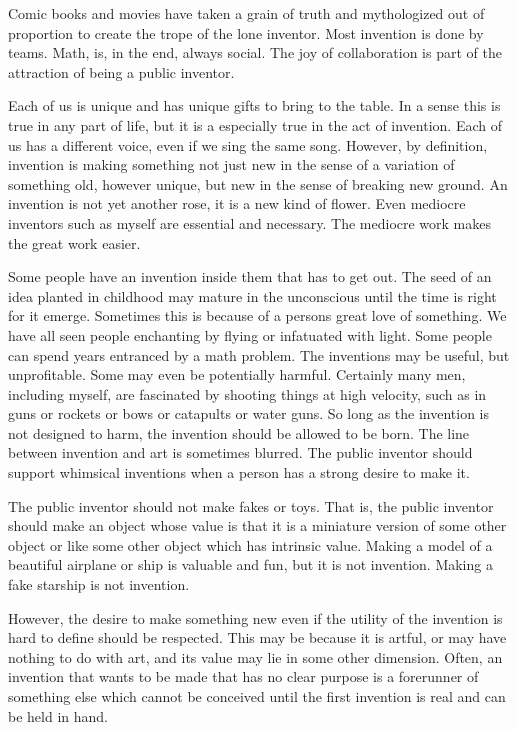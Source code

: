 \documentclass[
	fontsize=10pt, %
	twoside=false, %
	secnumdepth=1, %
]{kaobook}
\begin{document}
Comic books and movies have taken a grain of truth
and mythologized out of proportion to create the trope
of the lone inventor.
Most invention is done by teams.
Math, is, in the end, always social.
The joy of collaboration is part of the attraction
of being a public inventor.

Each of us is unique and has unique gifts to bring
to the table.
In a sense this is true in any part of life,
but it is a especially true in the act of invention.
Each of us has a different voice, even if we sing
the same song.
However, by definition, invention is making something
not just new in the sense of a variation of something
old, however unique, but new in the sense of breaking new
ground.
An invention is not yet another rose, it is a new kind of flower.
Even mediocre inventors such as myself are essential and necessary.
The mediocre work makes the great work easier.

Some people have an invention inside them that has to get out.
The seed of an idea planted in childhood may mature in the unconscious
until the time is right for it emerge.
Sometimes this is because of a persons great love of something.
We have all seen people enchanting by flying or
infatuated with light.
Some people can spend years entranced by a math problem.
The inventions may be useful, but unprofitable.
Some may even be potentially harmful. Certainly many men,
including myself, are fascinated by shooting things at
high velocity, such as in guns or rockets or bows
or catapults or water guns.
So long as the invention is not designed to harm,
the invention should be allowed to be born.
The line between invention and art is sometimes blurred.
The public inventor should support whimsical inventions
when a person has a strong desire to make it.

The public inventor should not make fakes or toys.
That is, the public inventor should make an object
whose value is that it is a miniature version of some
other object or like some other object which has intrinsic value.
Making a model of a beautiful airplane or ship is valuable
and fun, but it is not invention.
Making a fake starship is not invention.

However, the desire to make something new even if the
utility of the invention is hard to define should be
respected. This may be because it is artful, or may
have nothing to do with art, and its value may lie
in some other dimension.
Often, an invention that wants to be made that has
no clear purpose is a forerunner of something else
which cannot be conceived until the first invention
is real and can be held in hand.
\end{document}
